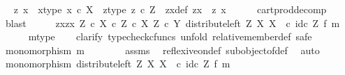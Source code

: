 \begin{isabellebody}
\ \isamarkupfalse%
\ z\ x\ \ x{\isacharunderscore}{\kern0pt}type{\isacharcolon}{\kern0pt}\ {\isachardoublequoteopen}x\ {\isasymin}\isactrlsub c\ X{\isachardoublequoteclose}\ \ z{\isacharunderscore}{\kern0pt}type{\isacharcolon}{\kern0pt}\ {\isachardoublequoteopen}z\ {\isasymin}\isactrlsub c\ Z{\isachardoublequoteclose}\ \ zx{\isacharunderscore}{\kern0pt}def{\isacharcolon}{\kern0pt}\ {\isachardoublequoteopen}zx\ {\isacharequal}{\kern0pt}\ {\isasymlangle}z{\isacharcomma}{\kern0pt}\ x{\isasymrangle}{\isachardoublequoteclose}\isanewline
\ \ \ \ \isamarkupfalse%
\ cart{\isacharunderscore}{\kern0pt}prod{\isacharunderscore}{\kern0pt}decomp\ \isamarkupfalse%
\ blast\isanewline
\ \ \isamarkupfalse%
\ \isamarkupfalse%
\ {\isachardoublequoteopen}{\isasymlangle}zx{\isacharcomma}{\kern0pt}zx{\isasymrangle}\ {\isasymin}\isactrlbsub {\isacharparenleft}{\kern0pt}Z\ {\isasymtimes}\isactrlsub c\ X{\isacharparenright}{\kern0pt}\ {\isasymtimes}\isactrlsub c\ Z\ {\isasymtimes}\isactrlsub c\ X\isactrlesub \ {\isacharparenleft}{\kern0pt}Z\ {\isasymtimes}\isactrlsub c\ Y{\isacharcomma}{\kern0pt}\ distribute{\isacharunderscore}{\kern0pt}left\ Z\ X\ X\ \ {\isasymcirc}\isactrlsub c\ {\isacharparenleft}{\kern0pt}id\isactrlsub c\ Z\ {\isasymtimes}\isactrlsub f\ m{\isacharparenright}{\kern0pt}{\isacharparenright}{\kern0pt}{\isachardoublequoteclose}\isanewline
\ \ \ \ \isamarkupfalse%
\ m{\isacharunderscore}{\kern0pt}type\isanewline
\ \ \isamarkupfalse%
\ {\isacharparenleft}{\kern0pt}clarify{\isacharcomma}{\kern0pt}\ typecheck{\isacharunderscore}{\kern0pt}cfuncs{\isacharcomma}{\kern0pt}\ unfold\ relative{\isacharunderscore}{\kern0pt}member{\isacharunderscore}{\kern0pt}def{}{\isacharcomma}{\kern0pt}\ safe{\isacharparenright}{\kern0pt}\isanewline
\ \ \ \ \isamarkupfalse%
\ {\isachardoublequoteopen}monomorphism\ m{\isachardoublequoteclose}\isanewline
\ \ \ \ \ \ \isamarkupfalse%
\ assms\ \isamarkupfalse%
\ reflexive{\isacharunderscore}{\kern0pt}on{\isacharunderscore}{\kern0pt}def\ subobject{\isacharunderscore}{\kern0pt}of{\isacharunderscore}{\kern0pt}def{}\ \isamarkupfalse%
\ auto\isanewline
\ \ \ \ \isamarkupfalse%
\ \isamarkupfalse%
\ {\isachardoublequoteopen}monomorphism\ {\isacharparenleft}{\kern0pt}distribute{\isacharunderscore}{\kern0pt}left\ Z\ X\ X\ \ {\isasymcirc}\isactrlsub c\ {\isacharparenleft}{\kern0pt}id\isactrlsub c\ Z\ {\isasymtimes}\isactrlsub f\ m{\isacharparenright}{\kern0pt}{\isacharparenright}{\kern0pt}{\isachardoublequoteclose}\isanewline

\end{isabellebody}

